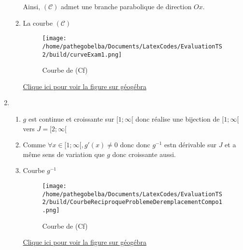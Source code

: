 \documentclass[12pt,a4paper]{article}
\begin{document}
\begin{enumerate}
\begin{enumerate}
                    Ainsi, \( (\mathcal{C}) \) admet une branche parabolique de direction \( Ox \).
              \item La courbe \( (\mathcal{C}) \)
                    \begin{center}
                        \begin{figure}[H]%
                            \centering
                            \texttt{[image: /home/pathegobelba/Documents/LatexCodes/EvaluationTS2/build/curveExam1.png]}
                            \caption{Courbe de (Cf)}
                            \label{fig:monimage}
                        \end{figure}
                    \end{center}
                    \href{https://www.geogebra.org/classic/tezwefad}{Clique ici pour voir la figure sur géogébra}
          \end{enumerate}
    \item
          \begin{enumerate}
              \item $g$ est continue et croissante sur $[1;\infty[$ donc réalise une bijection de $[1;\infty[$ vers $J=[2;\infty[$
              \item Comme $\forall x \in [1;\infty[, g'(x)\neq 0$ donc donc $g^{-1}$ estn dérivable sur $J$ et a même sens de variation que $g$ donc croissante aussi.
              \item Courbe $g^{-1}$
                    \begin{center}
                        \begin{figure}[H]%
                            \centering
                            \texttt{[image: /home/pathegobelba/Documents/LatexCodes/EvaluationTS2/build/CourbeReciproqueProblemeDeremplacementCompo1.png]}
                            \caption{Courbe de (Cf)}
                            \label{fig:monimage}
                        \end{figure}
                    \end{center}
                    \href{https://www.geogebra.org/m/enjrqsgy}{Clique ici pour voir la figure sur géogébra}
          \end{enumerate}
\end{enumerate}
\end{document}
